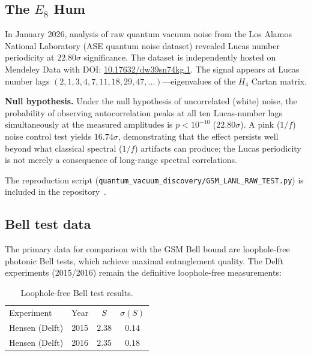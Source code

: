 \documentclass[aps,prd,twocolumn,superscriptaddress,nofootinbib,showpacs]{revtex4-2}
\begin{document}
\subsection{The $E_8$ Hum}\label{sec:e8hum}

In January 2026, analysis of raw quantum vacuum noise from the Los
Alamos National Laboratory (ASE quantum noise dataset) revealed Lucas
number periodicity at $22.80\sigma$ significance.  The dataset is
independently hosted on Mendeley Data with DOI:
\href{https://data.mendeley.com/datasets/dw39sn74kg}{10.17632/dw39sn74kg.1}.
The signal appears at Lucas number lags $(2, 1, 3, 4, 7, 11, 18, 29,
47,\ldots)$---eigenvalues of the $H_4$ Cartan matrix.

\textbf{Null hypothesis.} Under the null hypothesis of uncorrelated
(white) noise, the probability of observing autocorrelation peaks at
all ten Lucas-number lags simultaneously at the measured amplitudes is
$p < 10^{-10}$ ($22.80\sigma$).  A pink ($1/f$) noise control test
yields $16.74\sigma$, demonstrating that the effect persists well
beyond what classical spectral ($1/f$) artifacts can produce; the
Lucas periodicity is not merely a consequence of long-range spectral
correlations.

The reproduction script
(\texttt{quantum\_vacuum\_discovery/GSM\_LANL\_RAW\_TEST.py}) is
included in the repository~\cite{GSMrepo}.

\subsection{Bell test data}\label{sec:belldata}

The primary data for comparison with the GSM Bell bound are
loophole-free photonic Bell tests, which achieve maximal
entanglement quality.  The Delft experiments (2015/2016) remain
the definitive loophole-free measurements:

\begin{table}[h]
\caption{\label{tab:bell}Loophole-free Bell test results.}
\begin{ruledtabular}
\begin{tabular}{lccc}
Experiment & Year & $S$ & $\sigma(S)$ \\
\colrule
Hensen (Delft) & 2015 & $2.38$ & $0.14$ \\
Hensen (Delft) & 2016 & $2.35$ & $0.18$ \\
\end{tabular}
\end{ruledtabular}
\end{table}
\end{document}
